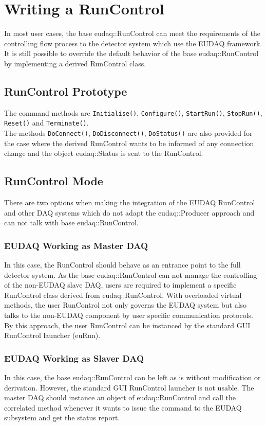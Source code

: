 \section{Writing a RunControl}\label{sec:RunControlWriting}
In most user cases, the base eudaq::RunControl can meet the requirements of the controlling flow process to the detector system which use the EUDAQ framework. It is still possible to override the default behavior of the base eudaq::RunControl by implementing a derived RunControl class.

\subsection{RunControl Prototype}
The command methods are \lstinline[style=cpp]{Initialise()}, \lstinline[style=cpp]{Configure()}, \lstinline[style=cpp]{StartRun()}, \lstinline[style=cpp]{StopRun()}, \lstinline[style=cpp]{Reset()} and \lstinline[style=cpp]{Terminate()}. \\

The methods \lstinline[style=cpp]{DoConnect()}, \lstinline[style=cpp]{DoDisconnect()}, \lstinline[style=cpp]{DoStatus()} are also provided for the case where the derived RunControl wants to be informed of any connection change and the object eudaq::Status is sent to the RunControl.\\


\subsection{RunControl Mode}
There are two options when making the integration of the EUDAQ RunControl and other DAQ systems which do not adapt the eudaq::Producer approach and can not talk with base eudaq::RunControl.
\subsubsection{EUDAQ Working as Master DAQ}
In this case, the RunControl should behave as an entrance point to the full detector system. As the base eudaq::RunControl can not manage the controlling of the non-EUDAQ slave DAQ, users are required to implement a specific RunControl class derived from eudaq::RunControl. With overloaded virtual methods, the user RunControl not only governs the EUDAQ system but also talks to the non-EUDAQ component by user specific communication protocols.\\
By this approach, the user RunControl can be instanced by the standard GUI RunControl launcher (euRun).

\subsubsection{EUDAQ Working as Slaver DAQ}
In this case, the base eudaq::RunControl can be left as is without modification or derivation. However, the standard GUI RunControl launcher is not usable. The master DAQ should instance an object
of eudaq::RunControl and call the correlated method whenever it wants to issue the command to the EUDAQ subsystem and get the status report.



